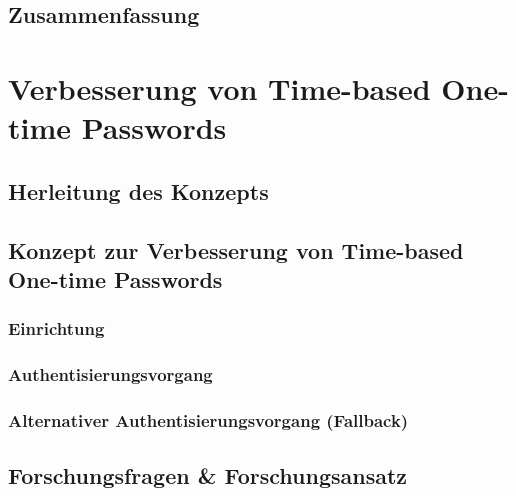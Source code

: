 \documentclass[doktyp=marbeit, twoside]{TUBAFarbeiten}
\begin{document}
    \subsection{Zusammenfassung}
        \label{sec: grundlagen zusammenfassung}
        


\newpage
\section{Verbesserung von Time-based One-time Passwords}
    \label{sec: verbesserung von totps}
    

    \subsection{Herleitung des Konzepts}
        \label{sec: herleitung konzept}
        

    \subsection{Konzept zur Verbesserung von Time-based One-time Passwords}
        \label{sec: funktionsweise konzept}
        

        \subsubsection{Einrichtung}
            \label{sec: konzept einrichtung}
            
        \subsubsection{Authentisierungsvorgang}
            \label{sec: konzept authentisierungsvorgang}
            
        \subsubsection{Alternativer Authentisierungsvorgang (Fallback)}
            \label{sec: konzept fallback}
            

    \subsection{Forschungsfragen \& Forschungsansatz}
        \label{sec: forschungsansatz}
        
\end{document}
